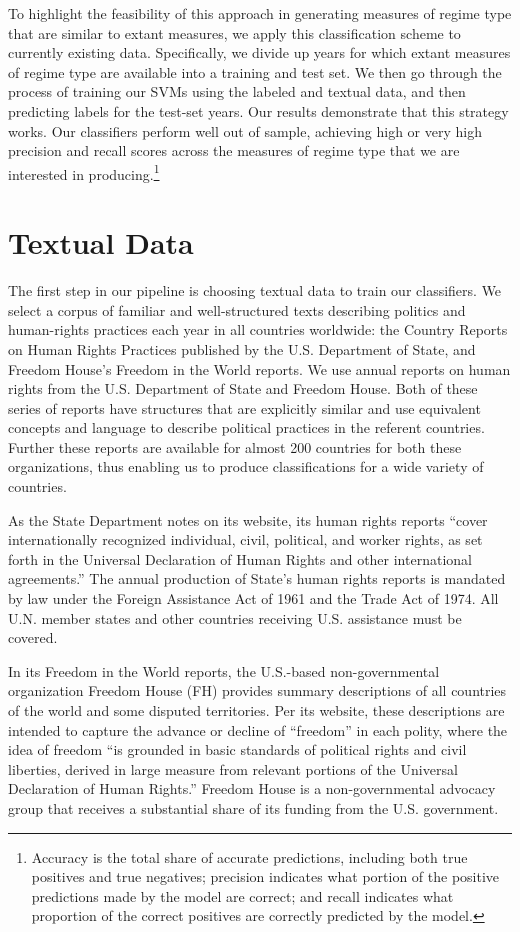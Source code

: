 \documentclass[pdftex,12pt,fullpage,oneside]{amsart}
\begin{document}
To highlight the feasibility of this approach in generating measures of regime type that are similar to extant measures, we apply this classification scheme to currently existing data. Specifically, we divide up years for which extant measures of regime type are available into a training and test set. We then go through the process of training our SVMs using the labeled and textual data, and then predicting labels for the test-set years. Our results demonstrate that this strategy works. Our classifiers perform well out of sample, achieving high or very high precision and recall scores across the measures of regime type that we are interested in producing.\footnote{Accuracy is the total share of accurate predictions, including both true positives and true negatives; precision indicates what portion of the positive predictions made by the model are correct; and recall indicates what proportion of the correct positives are correctly predicted by the model.}

\section{Textual Data}

The first step in our pipeline is choosing textual data to train our classifiers. We select a corpus of familiar and well-structured texts describing politics and human-rights practices each year in all countries worldwide: the Country Reports on Human Rights Practices published by the U.S. Department of State, and Freedom House's Freedom in the World reports. We use annual reports on human rights from the U.S. Department of State and Freedom House. Both of these series of reports have structures that are explicitly similar and use equivalent concepts and language to describe political practices in the referent countries. Further these reports are available for almost 200 countries for both these organizations, thus enabling us to produce classifications for a wide variety of countries. 

As the State Department notes on its website, its human rights reports ``cover internationally recognized individual, civil, political, and worker rights, as set forth in the Universal Declaration of Human Rights and other international agreements.'' The annual production of State's human rights reports is mandated by law under the Foreign Assistance Act of 1961 and the Trade Act of 1974. All U.N. member states and other countries receiving U.S. assistance must be covered. 

In its Freedom in the World reports, the U.S.-based non-governmental organization Freedom House (FH) provides summary descriptions of all countries of the world and some disputed territories. Per its website, these descriptions are intended to capture the advance or decline of ``freedom'' in each polity, where the idea of freedom ``is grounded in basic standards of political rights and civil liberties, derived in large measure from relevant portions of the Universal Declaration of Human Rights.'' Freedom House is a non-governmental advocacy group that receives a substantial share of its funding from the U.S. government.
\end{document}
